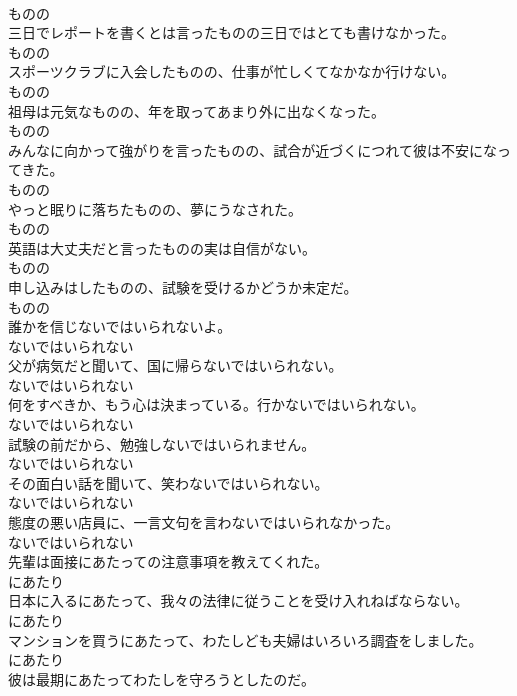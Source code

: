 \documentclass[8pt]{extreport}
\begin{document}
\begin{CJK}{UTF8}{min}
\\	ものの
\\	三日でレポートを書くとは言ったものの三日ではとても書けなかった。	
\\	ものの
\\	スポーツクラブに入会したものの、仕事が忙しくてなかなか行けない。	
\\	ものの
\\	祖母は元気なものの、年を取ってあまり外に出なくなった。	
\\	ものの
\\	みんなに向かって強がりを言ったものの、試合が近づくにつれて彼は不安になってきた。	
\\	ものの
\\	やっと眠りに落ちたものの、夢にうなされた。	
\\	ものの
\\	英語は大丈夫だと言ったものの実は自信がない。	
\\	ものの
\\	申し込みはしたものの、試験を受けるかどうか未定だ。	
\\	ものの
\\	誰かを信じないではいられないよ。	
\\	ないではいられない
\\	父が病気だと聞いて、国に帰らないではいられない。	
\\	ないではいられない
\\	何をすべきか、もう心は決まっている。行かないではいられない。	
\\	ないではいられない
\\	試験の前だから、勉強しないではいられません。	
\\	ないではいられない
\\	その面白い話を聞いて、笑わないではいられない。	
\\	ないではいられない
\\	態度の悪い店員に、一言文句を言わないではいられなかった。	
\\	ないではいられない
\\	先輩は面接にあたっての注意事項を教えてくれた。	
\\	にあたり
\\	日本に入るにあたって、我々の法律に従うことを受け入れねばならない。	
\\	にあたり
\\	マンションを買うにあたって、わたしども夫婦はいろいろ調査をしました。	
\\	にあたり
\\	彼は最期にあたってわたしを守ろうとしたのだ。	

\end{CJK}
\end{document}
